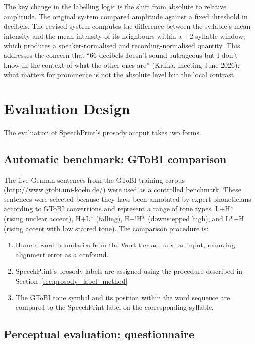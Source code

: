The key change in the labelling logic is the shift from absolute to relative
amplitude. The original system compared amplitude against a fixed threshold in
decibels. The revised system computes the difference between the syllable's mean
intensity and the mean intensity of its neighbours within a $\pm 2$ syllable
window, which produces a speaker-normalised and recording-normalised quantity.
This addresses the concern that ``66 decibels doesn't sound outrageous but I
don't know in the context of what the other ones are'' (Krifka, meeting June 2026):
what matters for prominence is not the absolute level but the local contrast.

\section{Evaluation Design}
\label{sec:eval_design}

The evaluation of SpeechPrint's prosody output takes two forms.

\subsection{Automatic benchmark: GToBI comparison}

The five German sentences from the GToBI training corpus
(\url{http://www.gtobi.uni-koeln.de/}) were used as a controlled benchmark.
These sentences were selected because they have been annotated by expert
phoneticians according to GToBI conventions and represent a range of tone types:
L+H* (rising nuclear accent), H+L* (falling), H+!H* (downstepped high), and
L*+H (rising accent with low starred tone). The comparison procedure is:
\begin{enumerate}
\item Human word boundaries from the Wort tier are used as input, removing
      alignment error as a confound.
\item SpeechPrint's prosody labels are assigned using the procedure described
      in Section~\ref{sec:prosody_label_method}.
\item The GToBI tone symbol and its position within the word sequence are
      compared to the SpeechPrint label on the corresponding syllable.
\end{enumerate}

\subsection{Perceptual evaluation: questionnaire}


